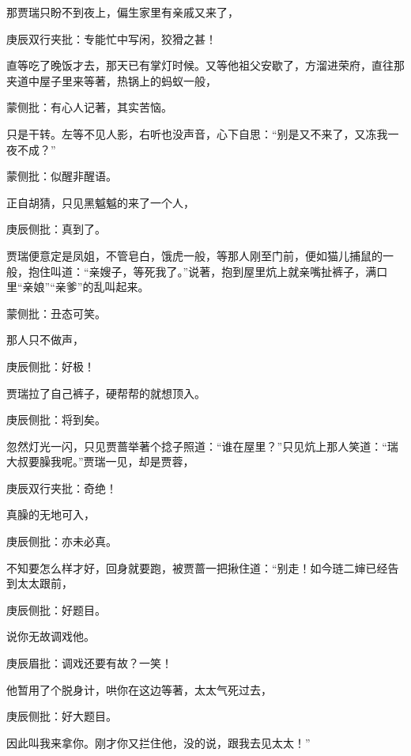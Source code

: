 \begin{parag}


    那贾瑞只盼不到夜上，偏生家里有亲戚又来了，\begin{note}庚辰双行夹批：专能忙中写闲，狡猾之甚！\end{note}直等吃了晚饭才去，那天已有掌灯时候。又等他祖父安歇了，方溜进荣府，直往那夹道中屋子里来等著，热锅上的蚂蚁一般，\begin{note}蒙侧批：有心人记著，其实苦恼。\end{note}只是干转。左等不见人影，右听也没声音，心下自思：“别是又不来了，又冻我一夜不成？”\begin{note}蒙侧批：似醒非醒语。\end{note}正自胡猜，只见黑魆魆的来了一个人，\begin{note}庚辰侧批：真到了。\end{note}贾瑞便意定是凤姐，不管皂白，饿虎一般，等那人刚至门前，便如猫儿捕鼠的一般，抱住叫道：“亲嫂子，等死我了。”说著，抱到屋里炕上就亲嘴扯裤子，满口里“亲娘”“亲爹”的乱叫起来。\begin{note}蒙侧批：丑态可笑。\end{note}那人只不做声，\begin{note}庚辰侧批：好极！\end{note}贾瑞拉了自己裤子，硬帮帮的就想顶入。\begin{note}庚辰侧批：将到矣。\end{note}忽然灯光一闪，只见贾蔷举著个捻子照道：“谁在屋里？”只见炕上那人笑道：“瑞大叔要臊我呢。”贾瑞一见，却是贾蓉，\begin{note}庚辰双行夹批：奇绝！\end{note}真臊的无地可入，\begin{note}庚辰侧批：亦未必真。\end{note}不知要怎么样才好，回身就要跑，被贾蔷一把揪住道：“别走！如今琏二婶已经告到太太跟前，\begin{note}庚辰侧批：好题目。\end{note}说你无故调戏他。\begin{note}庚辰眉批：调戏还要有故？一笑！\end{note}他暂用了个脱身计，哄你在这边等著，太太气死过去，\begin{note}庚辰侧批：好大题目。\end{note}因此叫我来拿你。刚才你又拦住他，没的说，跟我去见太太！”
\end{parag}



